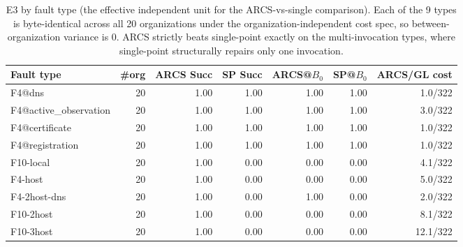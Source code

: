 \begin{table}[t]\centering\small
\caption{E3 by fault type (the effective independent unit for the ARCS-vs-single comparison). Each of the 9 types is byte-identical across all 20 organizations under the organization-independent cost spec, so between-organization variance is 0. ARCS strictly beats single-point exactly on the multi-invocation types, where single-point structurally repairs only one invocation.}
\label{tab:e3-faulttype}
\begin{tabular}{lrrrrrr}\toprule
Fault type & \#org & ARCS Succ & SP Succ & ARCS@$B_0$ & SP@$B_0$ & ARCS/GL cost\\\midrule
F4@dns & 20 & 1.00 & 1.00 & 1.00 & 1.00 & 1.0/322\\
F4@active\_observation & 20 & 1.00 & 1.00 & 1.00 & 1.00 & 3.0/322\\
F4@certificate & 20 & 1.00 & 1.00 & 1.00 & 1.00 & 1.0/322\\
F4@registration & 20 & 1.00 & 1.00 & 1.00 & 1.00 & 1.0/322\\
F10-local & 20 & 1.00 & 0.00 & 0.00 & 0.00 & 4.1/322\\
F4-host & 20 & 1.00 & 0.00 & 0.00 & 0.00 & 5.0/322\\
F4-2host-dns & 20 & 1.00 & 0.00 & 1.00 & 0.00 & 2.0/322\\
F10-2host & 20 & 1.00 & 0.00 & 0.00 & 0.00 & 8.1/322\\
F10-3host & 20 & 1.00 & 0.00 & 0.00 & 0.00 & 12.1/322\\
\bottomrule\end{tabular}\end{table}

